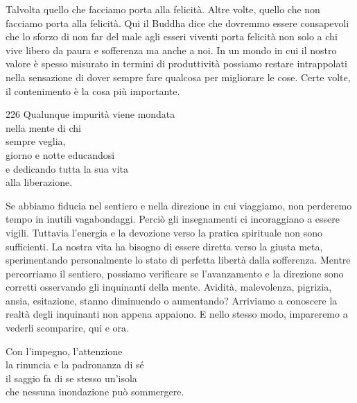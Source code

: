 \begin{dhpRefl}
  Talvolta quello che facciamo porta alla felicità. Altre volte, quello che non
  facciamo porta alla felicità. Qui il Buddha dice che dovremmo essere
  consapevoli che lo sforzo di non far del male agli esseri viventi porta
  felicità non solo a chi vive libero da paura e sofferenza ma anche a noi. In
  un mondo in cui il nostro valore è spesso misurato in termini di produttività
  possiamo restare intrappolati nella sensazione di dover sempre fare qualcosa
  per migliorare le cose. Certe volte, il contenimento è la cosa più importante.
\end{dhpRefl}


\begin{dhpVerse}{226}
\label{dhp-226}
Qualunque impurità viene mondata\\
nella mente di chi\\
sempre veglia,\\
giorno e notte educandosi\\
e dedicando tutta la sua vita\\
alla liberazione.
\end{dhpVerse}

\begin{dhpRefl}
  Se abbiamo fiducia nel sentiero e nella direzione in cui viaggiamo, non
  perderemo tempo in inutili vagabondaggi. Perciò gli insegnamenti ci
  incoraggiano a essere vigili. Tuttavia l'energia e la devozione verso la
  pratica spirituale non sono sufficienti. La nostra vita ha bisogno di essere
  diretta verso la giusta meta, sperimentando personalmente lo stato di perfetta
  libertà dalla sofferenza. Mentre percorriamo il sentiero, possiamo verificare
  se l'avanzamento e la direzione sono corretti osservando gli inquinanti della
  mente. Avidità, malevolenza, pigrizia, ansia, esitazione, stanno diminuendo o
  aumentando? Arriviamo a conoscere la realtà degli inquinanti non appena
  appaiono. E nello stesso modo, impareremo a vederli scomparire, qui e ora.
\end{dhpRefl}


\begin{dhpVerse}{25}
\label{dhp-25}
Con l'impegno, l'attenzione\\
la rinuncia e la padronanza di sé\\
il saggio fa di se stesso un'isola\\
che nessuna inondazione può sommergere.
\end{dhpVerse}

